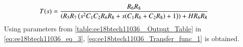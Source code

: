 \begin{enumerate}[label=\arabic*.,ref=\theenumi]
\small
\begin{align}
    T(s)&=\frac{R_6R_8}{(R_5R_7\left(s^2C_1C_2R_6R_8+s(C_1R_6+C_2R_8)+1\right))+HR_6R_8} 
    \label{eq:ee18btech11036_eq_3}
\end{align}
\normalsize
Using parameters from \ref{table:ee18btech11036_ Output_Table} in 
\eqref{eq:ee18btech11036_eq_3}, \eqref{eq:ee18btech11036_Transfer_func_1} is obtained.


\end{enumerate}
